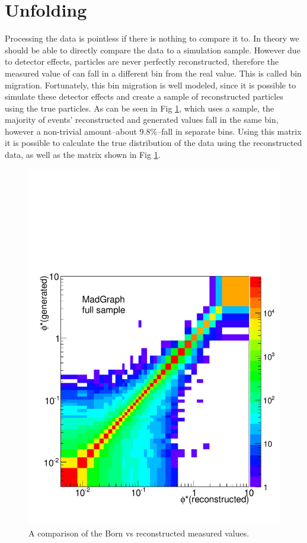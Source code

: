 \section{Unfolding}

Processing the data is pointless if there is nothing to compare it to. In theory we should be able to directly compare the data to a simulation sample. However due to detector effects, particles are never perfectly reconstructed, therefore the measured value of \phistar  can fall in a different bin from the real value. This is called bin migration. Fortunately, this bin migration is well modeled, since it is possible to simulate these detector effects and create a sample of reconstructed particles using the true particles. As can be seen in Fig \ref{fig:1DBinMigration}, which uses a \MADGRAPH sample, the majority of events' reconstructed and generated \phistar values fall in the same bin, however a non-trivial amount--about 9.8\%--fall in separate bins. Using this matrix it is possible to calculate the true distribution of the data using the reconstructed data, as well as the matrix shown in Fig \ref{fig:1DBinMigration}. 
\begin{figure}
    \centering
    \includegraphics[width=\linewidth]{figures/Simulation/GenRecoOneDTwoDPlot.pdf}
    \caption{A comparison of the Born vs reconstructed measured values. }
    \label{fig:1DBinMigration}
\end{figure}
